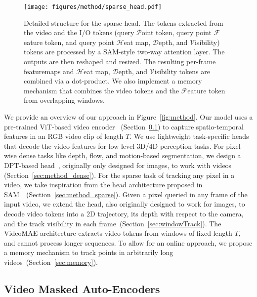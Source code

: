 \begin{figure*}[htbp]
    \captionsetup{skip=4pt}
    \centering
    \texttt{[image: figures/method/sparse\_head.pdf]}
    \caption{Detailed structure for the sparse head. The tokens extracted from the video and the I/O tokens (query $\mathcal{P}$oint token, query point $\mathcal{F}$eature token, and query point $\mathcal{H}$eat map, $\mathcal{D}$epth, and $\mathcal{V}$isibility) tokens are processed by a SAM-style two-way attention layer. The outputs are then reshaped and resized. The resulting per-frame featuremaps and $\mathcal{H}$eat map, $\mathcal{D}$epth, and $\mathcal{V}$isibility tokens are combined via a dot-product. We also implement a memory mechanism that combines the video tokens and the $\mathcal{F}$eature token from overlapping windows.%
    }
    \label{fig:sparse_head}
\end{figure*}


We provide an overview of our approach in Figure~\ref{fig:method}.
Our model uses a pre-trained ViT-based video encoder~\cite{wang2023videomaev2} (Section~\ref{sec:method_mae}) to capture spatio-temporal features in an RGB video clip of length $T$.
We use lightweight task-specific heads that decode the video features for low-level 3D/4D perception tasks.
For pixel-wise dense tasks like depth, flow, and motion-based segmentation, we design a DPT-based head~\cite{ranftl2021dpt}, originally only designed for images, to work with videos (Section~\ref{sec:method_dense}).
For the sparse task of tracking any pixel in a video, we take inspiration from the head architecture proposed in SAM~\cite{kirillov2023SAM}~(Section~\ref{sec:method_sparse}).
Given a pixel queried in any frame of the input video, we extend the head, also originally designed to work for images, to decode video tokens into a 2D trajectory, its depth with respect to the camera, and the track visibility in each frame~(Section~\ref{sec:windowTrack}).
The VideoMAE architecture extracts video tokens from windows of fixed length $T$, and cannot process longer sequences.
To allow for an online approach, we propose a memory mechanism to track points in arbitrarily long videos~(Section~\ref{sec:memory}).

\subsection{Video Masked Auto-Encoders}\label{sec:method_mae}


